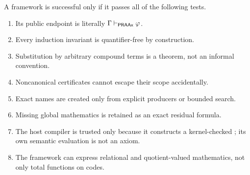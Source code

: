 A framework is successful only if it passes all of the following tests.

\begin{enumerate}[label=(\roman*)]
\item Its public endpoint is literally \(\Gamma\mathrel{\vdash_{\mathsf{PRAAx}}}\varphi\).
\item Every induction invariant is quantifier-free by construction.
\item Substitution by arbitrary compound terms is a theorem, not an informal
  convention.
\item Noncanonical certificates cannot escape their scope accidentally.
\item Exact names are created only from explicit producers or bounded search.
\item Missing global mathematics is retained as an exact residual formula.
\item The host compiler is trusted only because it constructs a kernel-checked
  ; its own semantic evaluation is not an axiom.
\item The framework can express relational and quotient-valued mathematics,
  not only total functions on codes.
\end{enumerate}
